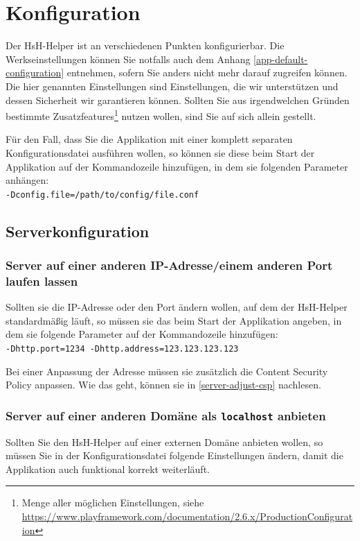 \documentclass[12pt,DIV14,BCOR10mm,a4paper,parskip=half-,headsepline,headinclude,english,ngerman,bibliography=totocnumbered]{scrreprt}
\begin{document}
\chapter{Konfiguration}
\label{manual:configuration}

Der HsH-Helper ist an verschiedenen Punkten konfigurierbar.
Die Werkseinstellungen können Sie notfalls auch dem Anhang \ref{app-default-configuration} entnehmen, sofern Sie anders nicht mehr darauf zugreifen können.
Die hier genannten Einstellungen sind Einstellungen, die wir unterstützen und dessen Sicherheit wir garantieren können.
Sollten Sie aus irgendwelchen Gründen bestimmte Zusatzfeatures\footnote{Menge aller möglichen Einstellungen, siehe \url{https://www.playframework.com/documentation/2.6.x/ProductionConfiguration}} nutzen wollen, sind Sie auf sich allein gestellt.

Für den Fall, dass Sie die Applikation mit einer komplett separaten Konfigurationsdatei ausführen wollen, so können sie diese beim Start der Applikation auf der Kommandozeile hinzufügen, in dem sie folgenden Parameter anhängen: \\
\texttt{-Dconfig.file=/path/to/config/file.conf}

\section{Serverkonfiguration}

\subsection{Server auf einer anderen IP-Adresse/einem anderen Port laufen lassen}

Sollten sie die IP-Adresse oder den Port ändern wollen, auf dem der HsH-Helper standardmäßig läuft, so müssen sie das beim Start der Applikation angeben, in dem sie folgende Parameter auf der Kommandozeile hinzufügen: \\
\texttt{-Dhttp.port=1234 -Dhttp.address=123.123.123.123}

Bei einer Anpassung der Adresse müssen sie zusätzlich die Content Security Policy anpassen.
Wie das geht, können sie in \autoref{server-adjust-csp} nachlesen.

\subsection{Server auf einer anderen Domäne als \texttt{localhost} anbieten}

Sollten Sie den HsH-Helper auf einer externen Domäne anbieten wollen, so müssen Sie in der Konfigurationsdatei folgende Einstellungen ändern, damit die Applikation auch funktional korrekt weiterläuft.
\end{document}
